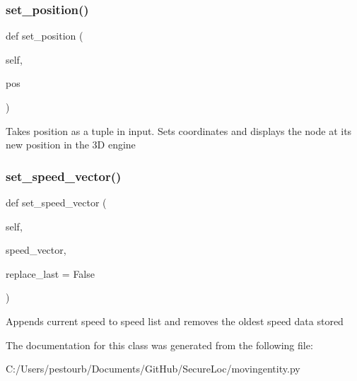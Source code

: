 \subsubsection{\texorpdfstring{set\+\_\+position()}{set\_position()}}
{\footnotesize\ttfamily def set\+\_\+position (\begin{DoxyParamCaption}\item[{}]{self,  }\item[{}]{pos }\end{DoxyParamCaption})}

\begin{DoxyVerb}Takes position as a tuple in input.
Sets coordinates and displays the node at its new position in the 3D engine\end{DoxyVerb}
 \mbox{\label{classmovingentity_1_1_moving_entity_a86f9b2b879ff5e2db1010bdf4d5a03a1}} 
\subsubsection{\texorpdfstring{set\+\_\+speed\+\_\+vector()}{set\_speed\_vector()}}
{\footnotesize\ttfamily def set\+\_\+speed\+\_\+vector (\begin{DoxyParamCaption}\item[{}]{self,  }\item[{}]{speed\+\_\+vector,  }\item[{}]{replace\+\_\+last = {\ttfamily False} }\end{DoxyParamCaption})}

\begin{DoxyVerb}Appends current speed to speed list and
removes the oldest speed data stored\end{DoxyVerb}
 

The documentation for this class was generated from the following file\+:\begin{DoxyCompactItemize}
\item 
C\+:/\+Users/pestourb/\+Documents/\+Git\+Hub/\+Secure\+Loc/movingentity.\+py\end{DoxyCompactItemize}
